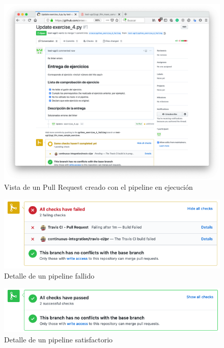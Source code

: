 \begin{figure}[h!]
\centering
\includegraphics[width=1.0\textwidth]{../images/github_pr_view}
\caption{Vista de un Pull Request creado con el pipeline en ejecución}
\label{fig:github_pr_view}
\end{figure}

\begin{figure}[h!]
\centering
\includegraphics[width=1.0\textwidth]{../images/travis_pipeline_failed}
\caption{Detalle de un pipeline fallido}
\label{fig:travis_pipeline_failed}
\end{figure}

\begin{figure}[h!]
\centering
\includegraphics[width=1.0\textwidth]{../images/travis_pipeline_passed}
\caption{Detalle de un pipeline satisfactorio}
\label{fig:travis_pipeline_passed}
\end{figure}

